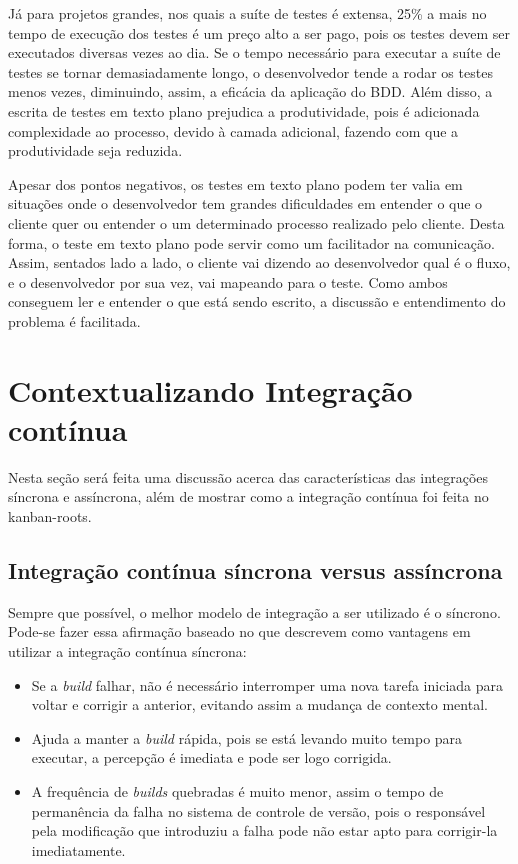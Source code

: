 Já para projetos grandes, nos quais a suíte de testes é extensa, 25\% a mais no tempo de execução dos testes é um preço alto a ser pago, pois os testes devem ser executados diversas vezes ao dia. Se o tempo necessário para executar a suíte de testes se tornar demasiadamente longo, o desenvolvedor tende a rodar os testes menos vezes, diminuindo, assim, a eficácia da aplicação do BDD. Além disso, a escrita de testes em texto plano prejudica a produtividade, pois é adicionada complexidade ao processo, devido à camada adicional, fazendo com que a produtividade seja reduzida.

Apesar dos pontos negativos, os testes em texto plano podem ter valia em situações onde o desenvolvedor tem grandes dificuldades em entender o que o cliente quer ou entender o um determinado processo realizado pelo cliente. Desta forma, o teste em texto plano pode servir como um facilitador na comunicação. Assim, sentados lado a lado, o cliente vai dizendo ao desenvolvedor qual é o fluxo, e o desenvolvedor por sua vez, vai mapeando para o teste. Como ambos conseguem ler e entender o que está sendo escrito, a discussão e entendimento do problema é facilitada.


\section{Contextualizando Integração contínua}

Nesta seção será feita uma discussão acerca das características das integrações síncrona e assíncrona, além de mostrar como a integração contínua foi feita no kanban-roots.

\subsection{Integração contínua síncrona versus assíncrona}
\label{sub:sincrona_x_assincrona}

Sempre que possível, o melhor modelo de integração a ser utilizado é o síncrono. Pode-se fazer essa afirmação baseado no que  descrevem como vantagens em utilizar a integração contínua síncrona:

\begin{itemize}
  \item Se a \textit{build} falhar, não é necessário interromper uma nova tarefa iniciada para voltar e corrigir a anterior, evitando assim a mudança de contexto mental.
  \item Ajuda a manter a \textit{build} rápida, pois se está levando muito tempo para executar, a percepção é imediata e pode ser logo corrigida.
  \item A frequência de \textit{builds} quebradas é muito menor, assim o tempo de permanência da falha no sistema de controle de versão, pois o responsável pela modificação que introduziu a falha pode não estar apto para corrigir-la imediatamente.
\end{itemize}

